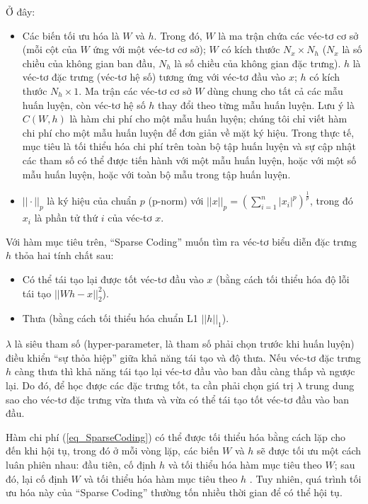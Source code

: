 Ở đây:
\begin{itemize}
	\item Các biến tối ưu hóa là $W$ và $h$. Trong đó, $W$ là ma trận chứa các véc-tơ cơ sở (mỗi cột của $W$ ứng với một véc-tơ cơ sở); $W$ có kích thước $N_x \times N_h$ ($N_x$ là số chiều của không gian ban đầu, $N_h$ là số chiều của không gian đặc trưng). $h$ là véc-tơ đặc trưng (véc-tơ hệ số) tương ứng với véc-tơ đầu vào $x$; $h$ có kích thước $N_h \times 1$. Ma trận các véc-tơ cơ sở $W$ dùng chung cho tất cả các mẫu huấn luyện, còn véc-tơ hệ số $h$ thay đổi theo từng mẫu huấn luyện. Lưu ý là $C(W, h)$ là hàm chi phí cho một mẫu huấn luyện; chúng tôi chỉ viết hàm chi phí cho một mẫu huấn luyện để đơn giản về mặt ký hiệu. Trong thực tế, mục tiêu là tối thiểu hóa chi phí trên toàn bộ tập huấn luyện và sự cập nhật các tham số có thể được tiến hành với một mẫu huấn luyện, hoặc với một số mẫu huấn luyện, hoặc với toàn bộ mẫu trong tập huấn luyện.
	\item $||\cdot||_p$ là ký hiệu của chuẩn $p$ (p-norm) với $||x||_p=\left(\sum_{i=1}^n|x_i|^p\right)^{\frac{1}{p}}$, trong đó $x_i$ là phần tử thứ $i$ của véc-tơ $x$.
\end{itemize}

Với hàm mục tiêu trên, ``Sparse Coding'' muốn tìm ra véc-tơ biểu diễn đặc trưng $h$ thỏa hai tính chất sau:
\begin{itemize}
	\item Có thể tái tạo lại được tốt véc-tơ đầu vào $x$ (bằng cách tối thiểu hóa độ lỗi tái tạo $||Wh - x||_2^2$).
	\item Thưa (bằng cách tối thiểu hóa chuẩn L1 $||h||_1$).
\end{itemize}

$\lambda$ là siêu tham số (hyper-parameter, là tham số phải chọn trước khi huấn luyện) điều khiển ``sự thỏa hiệp'' giữa khả năng tái tạo và độ thưa. Nếu véc-tơ đặc trưng $h$ càng thưa thì khả năng tái tạo lại véc-tơ đầu vào ban đầu càng thấp và ngược lại. Do đó, để học được các đặc trưng tốt, ta cần phải chọn giá trị $\lambda$ trung dung sao cho véc-tơ đặc trưng vừa thưa và vừa có thể tái tạo tốt véc-tơ đầu vào ban đầu. 

Hàm chi phí (\ref{eq_SparseCoding}) có thể được tối thiểu hóa bằng cách lặp cho đến khi hội tụ, trong đó ở mỗi vòng lặp, các biến $W$ và $h$ sẽ được tối ưu một cách luân phiên nhau: đầu tiên, cố định $h$ và tối thiểu hóa hàm mục tiêu theo $W$; sau đó, lại cố định $W$ và tối thiểu hóa hàm mục tiêu theo $h$ \cite{lee2006efficient}. Tuy nhiên, quá trình tối ưu hóa này của ``Sparse Coding'' thường tốn nhiều thời gian để có thể hội tụ.

